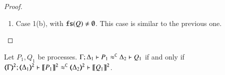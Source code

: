 \begin{proof}
\begin{enumerate}[1.]
	\item Case 1(b), with $\mathtt{fs}(Q) \neq  \emptyset$. This case is similar to the previous one.
	\end{enumerate}

%
%
\end{proof}

\begin{proposition}\myrm
	\label{app:prop:fulla_HOp_to_p}
	Let $P_1, Q_1$ be \HOp processes.
	$\Gamma; \Delta_1 \vdash P_1 \approx^\mathtt{C} \Delta_2 \vdash Q_1$
	if and only if
	$\horel{\tmap{\Gamma}{2}}{\tmap{\Delta_1}{2}}{\pmap{P_1}{2}}{\fwb}{\tmap{\Delta_2}{2}}{\pmap{Q_1}{2}}$.
\end{proposition}

